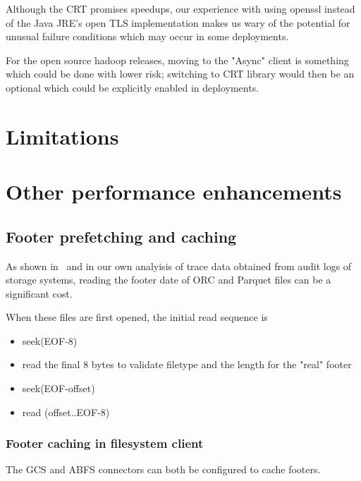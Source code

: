 \documentclass[manuscript]{acmart}
\begin{document}
Although the CRT promises speedups, our experience with using openssl instead of
the Java JRE's open TLS implementation makes us wary of the potential for
unusual failure conditions which may occur in some deployments.

For the open source hadoop releases, moving to the "Async" client is something
which could be done with lower risk; switching to CRT library would then be
an optional which could be explicitly enabled in deployments.


\section{Limitations}
\label{sec:limitations}


\section{Other performance enhancements}
\label{sec:enhancements}

\subsection{Footer prefetching and caching}\label{subsec:footer-prefetching-and-caching}

As shown in\ \cite{zeng2023empirical} and in our own analyisis of trace data
obtained from audit logs of storage systems, reading the footer date of ORC and Parquet
files can be a significant cost.

When these files are first opened, the initial read sequence is

\begin{itemize}
  \item{seek(EOF-8)}
  \item{read the final 8 bytes to validate filetype and the length for the "real" footer}
  \item{seek(EOF-offset)}
  \item{read (offset..EOF-8)}
\end{itemize}

\subsubsection{Footer caching in filesystem client}

The GCS and ABFS connectors can both be configured to cache footers.
\end{document}
